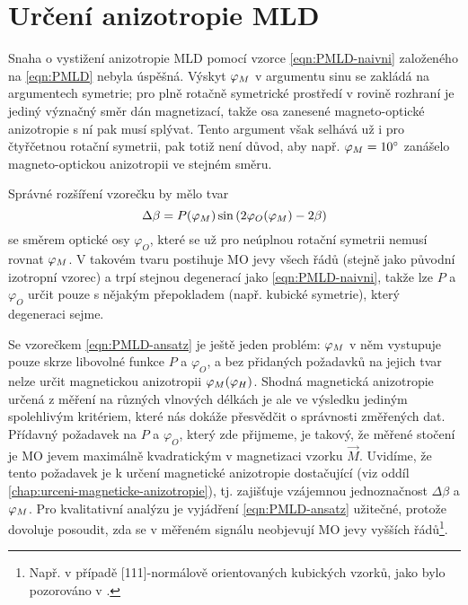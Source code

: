 \section{Určení anizotropie MLD}
\label{chap:anizotropie-MLD}

Snaha o vystižení anizotropie MLD pomocí vzorce \eqref{eqn:PMLD-naivni} založeného na \eqref{eqn:PMLD} nebyla úspěšná.
Výskyt $\varphi_M$ v argumentu sinu se zakládá na argumentech symetrie; pro plně rotačně symetrické prostředí v rovině rozhraní je jediný význačný směr dán magnetizací, takže osa zanesené magneto-optické anizotropie s ní pak musí splývat.
Tento argument však selhává už i pro čtyřčetnou rotační symetrii, pak totiž není důvod, aby např. $\varphi_M=\SI{10}{\degree}$ zanášelo magneto-optickou anizotropii ve stejném směru.

Správné rozšíření vzorečku by mělo tvar
\begin{equation}
\label{eqn:PMLD-ansatz}
    \Delta\beta = P(\varphi_M) \sin \left( 2\varphi_O(\varphi_M) - 2\beta   \right)
\end{equation}
se směrem optické osy $\varphi_O$, které se už pro neúplnou rotační symetrii nemusí rovnat $\varphi_M$.
V takovém tvaru postihuje MO jevy všech řádů (stejně jako původní izotropní vzorec) a trpí stejnou degenerací jako \eqref{eqn:PMLD-naivni}, takže lze $P$ a $\varphi_O$ určit pouze s nějakým přepokladem (např. kubické symetrie), který degeneraci sejme.

Se vzorečkem \eqref{eqn:PMLD-ansatz} je ještě jeden problém: $\varphi_M$ v něm vystupuje pouze skrze libovolné funkce $P$ a $\varphi_O$, a bez přidaných požadavků na jejich tvar nelze určit magnetickou anizotropii $\varphi_M(\varphi_H)$.
Shodná magnetická anizotropie určená z měření na různých vlnových délkách je ale ve výsledku jediným spolehlivým kritériem, které nás dokáže přesvědčit o správnosti změřených dat.
Přídavný požadavek na $P$ a $\varphi_O$, který zde přijmeme, je takový, že měřené stočení je MO jevem maximálně kvadratickým v magnetizaci vzorku $\vec{M}$.
Uvidíme, že tento požadavek je k určení magnetické anizotropie dostačující (viz oddíl \ref{chap:urceni-magneticke-anizotropie}), tj. zajišťuje vzájemnou jednoznačnost $\Delta\beta$ a $\varphi_M$.
Pro kvalitativní analýzu je vyjádření \eqref{eqn:PMLD-ansatz} užitečné, protože dovoluje posoudit, zda se v měřeném signálu neobjevují MO jevy vyšších řádů\footnote{Např. v případě [111]-normálově orientovaných kubických vzorků, jako bylo pozorováno v \cite{silberQuadraticMagnetoopticKerr2019a}.}.

